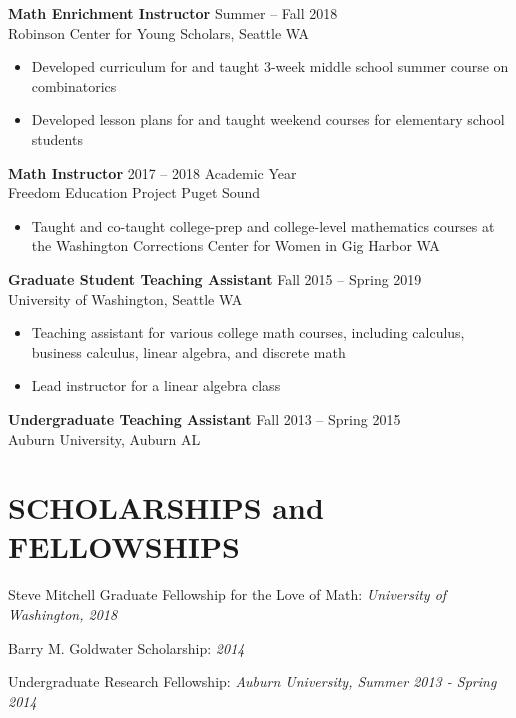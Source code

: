 \documentclass{res}
\begin{document}
\begin{resume}
{\bf Math Enrichment Instructor} \hfill Summer -- Fall 2018 \\
Robinson Center for Young Scholars, Seattle WA

\begin{itemize}
\item Developed curriculum for and taught 3-week middle school summer course on combinatorics
\item Developed lesson plans for and taught weekend courses for elementary school students
\end{itemize}


{\bf Math Instructor} \hfill 2017 -- 2018 Academic Year \\
Freedom Education Project Puget Sound

\begin{itemize}
\item Taught and co-taught college-prep and college-level mathematics courses at the Washington Corrections Center for Women in Gig Harbor WA
\end{itemize}


{\bf Graduate Student Teaching Assistant} \hfill Fall 2015 -- Spring 2019 \\
University of Washington, Seattle WA

\begin{itemize}
\item Teaching assistant for various college math courses, including calculus, business calculus, linear algebra, and discrete math
\item Lead instructor for a linear algebra class
\end{itemize}


	

	
	
{\bf Undergraduate Teaching Assistant} \hfill Fall 2013 -- Spring 2015 \\
Auburn University, Auburn AL

	

	

\section{SCHOLARSHIPS and FELLOWSHIPS}
	\vspace{2mm}
Steve Mitchell Graduate Fellowship for the Love of Math: \textit{University of Washington, 2018}
	
Barry M. Goldwater Scholarship: \textit{2014}

Undergraduate Research Fellowship: \textit{Auburn University, Summer 2013 - Spring 2014}


\end{resume}
\end{document}
